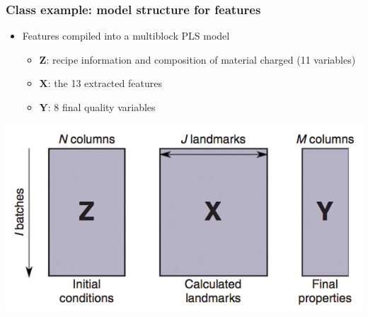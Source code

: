 \begin{frame}\frametitle{Class example: model structure for features}

	\begin{itemize}
		\item	Features compiled into a multiblock PLS model
		
				\begin{itemize}
					\item	\( \mathbf{Z} \): recipe information and composition of material charged (11 variables)
					
					\item	\( \mathbf{X} \): the 13 extracted features
					
					\item	\( \mathbf{Y} \): 8 final quality variables
				\end{itemize}
	\end{itemize}
	
	\begin{center}
		\includegraphics[width=\textwidth]{images/fmc/fmc-features-multiblock.png}
	\end{center}
\end{frame}

